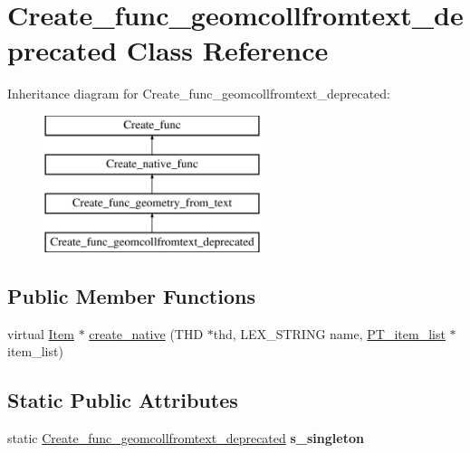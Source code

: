 \hypertarget{classCreate__func__geomcollfromtext__deprecated}{}\section{Create\+\_\+func\+\_\+geomcollfromtext\+\_\+deprecated Class Reference}
\label{classCreate__func__geomcollfromtext__deprecated}
Inheritance diagram for Create\+\_\+func\+\_\+geomcollfromtext\+\_\+deprecated\+:\begin{figure}[H]
\begin{center}
\leavevmode
\includegraphics[height=4.000000cm]{classCreate__func__geomcollfromtext__deprecated}
\end{center}
\end{figure}
\subsection*{Public Member Functions}
\begin{DoxyCompactItemize}
\item 
virtual \mbox{\hyperlink{classItem}{Item}} $\ast$ \mbox{\hyperlink{classCreate__func__geomcollfromtext__deprecated_a07bdd5b9d90da6e646fd169dbdf04ea2}{create\+\_\+native}} (T\+HD $\ast$thd, L\+E\+X\+\_\+\+S\+T\+R\+I\+NG name, \mbox{\hyperlink{classPT__item__list}{P\+T\+\_\+item\+\_\+list}} $\ast$item\+\_\+list)
\end{DoxyCompactItemize}
\subsection*{Static Public Attributes}
\begin{DoxyCompactItemize}
\item 
\mbox{\label{classCreate__func__geomcollfromtext__deprecated_ad2dc6252387175d3c91fc8d58dd143ff}} 
static \mbox{\hyperlink{classCreate__func__geomcollfromtext__deprecated}{Create\+\_\+func\+\_\+geomcollfromtext\+\_\+deprecated}} {\bfseries s\+\_\+singleton}
\end{DoxyCompactItemize}
